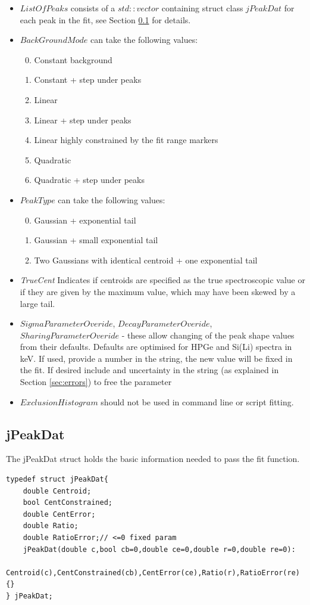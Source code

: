 \documentclass[a4paper,10pt]{article}
\begin{document}
\renewcommand{\labelenumi}{\arabic{enumi}}
\begin{itemize}
	\item $ListOfPeaks$ consists of a $std::vector$ containing struct class $jPeakDat$ for each peak in the fit, see Section \ref{sec:jpeakdata} for details.
	\item $BackGroundMode$ can take the following values:
      \begin{enumerate}
      \setcounter{enumi}{-1}
      \item Constant background
      \item Constant + step under peaks
      \setcounter{enumi}{9}
      \item Linear
      \item Linear + step under peaks
      \item Linear highly constrained by the fit range markers
      \setcounter{enumi}{19}
      \item Quadratic
      \item Quadratic + step under peaks
      \end{enumerate}
    \item $PeakType$ can take the following values:
      \begin{enumerate}
      \setcounter{enumi}{-1}
      \item Gaussian + exponential tail
      \item Gaussian + small exponential tail
      \item Two Gaussians with identical centroid + one exponential tail
      \end{enumerate}
    \item \textit{TrueCent} Indicates if centroids are specified as the true spectroscopic value or if they are given by the maximum value, which may have been skewed by a large tail. 
    \item $SigmaParameterOveride$, $DecayParameterOveride$, $SharingParameterOveride$ - these allow changing of the peak shape values from their defaults. Defaults are optimised for HPGe and Si(Li) spectra in keV. If used, provide a number in the string, the new value will be fixed in the fit. If desired include and uncertainty in the string (as explained in Section \ref{sec:errors}) to free the parameter
    \item $ExclusionHistogram$ should not be used in command line or script fitting.   
\end{itemize}

\subsection{jPeakDat}\label{sec:jpeakdata}
The jPeakDat struct holds the basic information needed to pass the fit function.
\lstset{language=C++}
\begin{lstlisting}
typedef struct jPeakDat{
	double Centroid;
	bool CentConstrained;
	double CentError;
	double Ratio;
	double RatioError;// <=0 fixed param
	jPeakDat(double c,bool cb=0,double ce=0,double r=0,double re=0):
	Centroid(c),CentConstrained(cb),CentError(ce),Ratio(r),RatioError(re){}
} jPeakDat;
\end{lstlisting}
\end{document}
